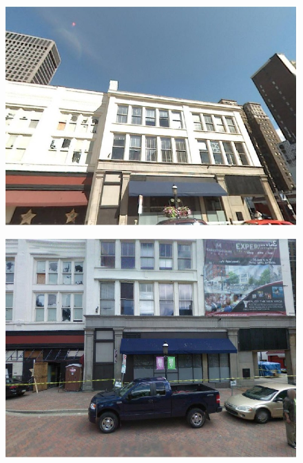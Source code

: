 \begin{figure}[!ht]
{\begin{minipage}{\subw}
{		  \includegraphics[width=1.05\linewidth]{imgs/demo01c.jpg}
		  }
		\end{minipage}
	 }
	 \hspace{3mm}
	 \colorbox{myGreen}{
		\begin{minipage}{\subw}
		  \centerline{
		  \includegraphics[width=1.05\linewidth]{imgs/demo02c.jpg}
		  }
		\end{minipage}
	 }
	 \colorbox{myRed}{
		\begin{minipage}{\subw}
		  \centerline{
}
\end{minipage}}
\end{figure}

